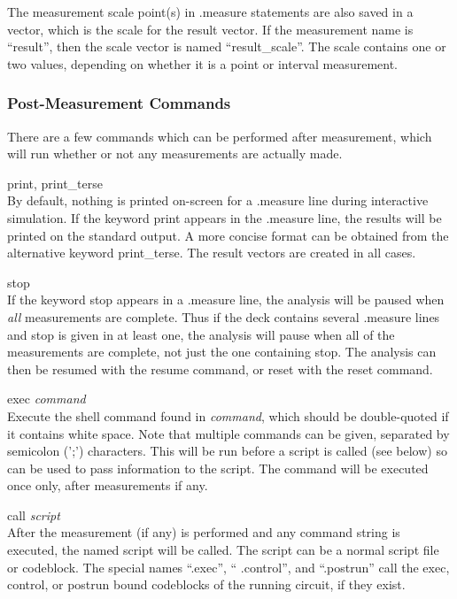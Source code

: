 The measurement scale point(s) in {\vt .measure} statements are also
saved in a vector, which is the scale for the result vector.  If the
measurement name is ``{\vt result}'', then the scale vector is named
``{\vt result\_scale}''.  The scale contains one or two values,
depending on whether it is a point or interval measurement.

\subsubsection{Post-Measurement Commands}

There are a few commands which can be performed after measurement,
which will run whether or not any measurements are actually made.

\begin{description}
\item{{\vt print}, {\vt print\_terse}}\\
By default, nothing is printed on-screen for a {\vt .measure} line
during interactive simulation.  If the keyword {\vt print} appears in
the {\vt .measure} line, the results will be printed on the standard
output.  A more concise format can be obtained from the alternative
keyword {\vt print\_terse}.  The result vectors are created in all
cases.

\item{\vt stop}\\
If the keyword {\vt stop} appears in a {\vt .measure} line, the
analysis will be paused when {\it all} measurements are complete. 
Thus if the deck contains several {\vt .measure} lines and {\vt stop}
is given in at least one, the analysis will pause when all of the
measurements are complete, not just the one containing {\vt stop}. 
The analysis can then be resumed with the {\cb resume} command, or
reset with the {\cb reset} command.

\item{{\vt exec} {\it command}}\\
Execute the {\WRspice} shell command found in {\it command\/}, which
should be double-quoted if it contains white space.  Note that
multiple commands can be given, separated by semicolon ({\vt ';'})
characters.  This will be run before a script is called (see below) so
can be used to pass information to the script.  The command will be
executed once only, after measurements if any.

\item{{\vt call} {\it script}}\\
After the measurement (if any) is performed and any command string is
executed, the named script will be called.  The script can be a normal
script file or codeblock.  The special names ``{\vt .exec}'', ``{\vt
.control}'', and ``{\vt .postrun}'' call the exec, control, or postrun
bound codeblocks of the running circuit, if they exist.


\end{description}
